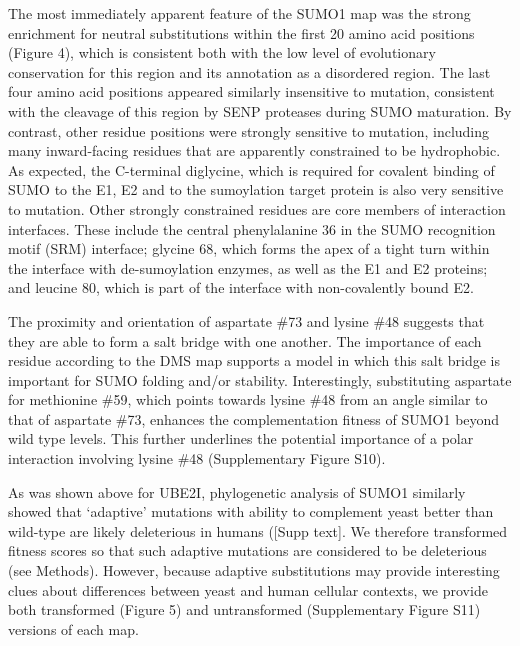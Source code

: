 The most immediately apparent feature of the SUMO1 map was the strong enrichment for neutral substitutions within the first 20 amino acid positions (Figure 4), which is consistent both with the low level of evolutionary conservation for this region and its annotation as a disordered region. The last four amino acid positions appeared similarly insensitive to mutation, consistent with the cleavage of this region by SENP proteases during SUMO maturation. By contrast, other residue positions were strongly sensitive to mutation, including many inward-facing residues that are apparently constrained to be hydrophobic. As expected, the C-terminal diglycine, which is required for covalent binding of SUMO to the E1, E2 and to the sumoylation target protein is also very sensitive to mutation. Other strongly constrained residues are core members of interaction interfaces. These include the central phenylalanine 36 in the SUMO recognition motif (SRM) interface; glycine 68, which forms the apex of a tight turn within the interface with de-sumoylation enzymes, as well as the E1 and E2 proteins; and leucine 80, which is part of the interface with non-covalently bound E2. 

The proximity and orientation of aspartate \#73 and lysine \#48 suggests that they are able to form a salt bridge with one another.  The importance of each residue according to the DMS map supports a model in which this salt bridge is important for SUMO folding and/or stability. Interestingly, substituting aspartate for methionine \#59, which points towards lysine \#48 from an angle similar to that of aspartate \#73, enhances the complementation fitness of SUMO1 beyond wild type levels.  This further underlines the potential importance of a polar interaction involving lysine \#48 (Supplementary Figure S10).

As was shown above for UBE2I, phylogenetic analysis of SUMO1 similarly showed that ‘adaptive’ mutations with ability to complement yeast better than wild-type are likely deleterious in humans ([Supp text]. We therefore transformed fitness scores so that such adaptive mutations are considered to be deleterious (see Methods).  However, because adaptive substitutions may provide interesting clues about differences between yeast and human cellular contexts, we provide both transformed (Figure 5) and untransformed (Supplementary Figure S11) versions of each map.

